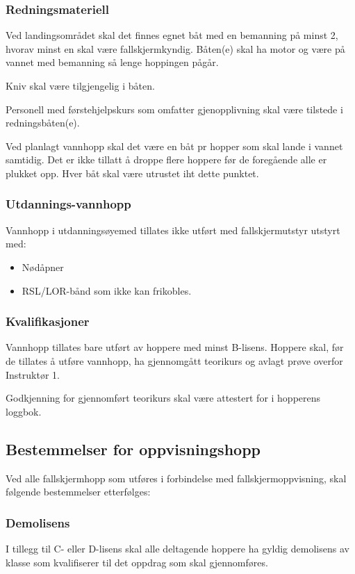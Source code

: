 \subsubsection{Redningsmateriell}
Ved landingsområdet skal det finnes egnet båt med en bemanning på minst 2, hvorav minst en skal være fallskjermkyndig. Båten(e) skal ha motor og være på vannet med bemanning så lenge hoppingen pågår.

Kniv skal være tilgjengelig i båten.

Personell med førstehjelpskurs som omfatter gjenopplivning skal være tilstede i redningsbåten(e).

Ved planlagt vannhopp skal det være en båt pr hopper som skal lande i vannet samtidig. Det er ikke tillatt å droppe flere hoppere før de foregående alle er plukket opp. Hver båt skal være utrustet iht dette punktet.

\subsubsection{Utdannings-vannhopp}
Vannhopp i utdanningsøyemed tillates ikke utført med fallskjermutstyr utstyrt med:
\begin{itemize}
	\item Nødåpner
	\item RSL/LOR-bånd som ikke kan frikobles.
\end{itemize}

\subsubsection{Kvalifikasjoner}
Vannhopp tillates bare utført av hoppere med minst B-lisens. Hoppere skal, før de tillates å utføre vannhopp, ha gjennomgått teorikurs og avlagt prøve overfor Instruktør 1.

Godkjenning for gjennomført teorikurs skal være attestert for i hopperens loggbok.

\subsection{Bestemmelser for oppvisningshopp}
Ved alle fallskjermhopp som utføres i forbindelse med fallskjermoppvisning, skal følgende bestemmelser etterfølges:

\subsubsection{Demolisens}
I tillegg til C- eller D-lisens skal alle deltagende hoppere ha gyldig demolisens av klasse som kvalifiserer til det oppdrag som skal gjennomføres.

